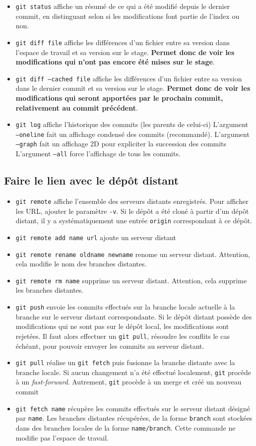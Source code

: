 \documentclass[french]{report}
\newcommand\itemb{\item[$\bullet$]}
\begin{document}
\begin{itemize}
    \itemb \texttt{git status} affiche un résumé de ce qui a été modifié depuis le dernier commit, en distinguant selon si les modifications font partie de l'index ou non.
    \itemb \texttt{git diff file} affiche les différences d'un fichier entre sa version dans l'espace de travail et sa version sur le stage.
    \textbf{Permet donc de voir les modifications qui n'ont pas encore été mises sur le stage}.
    \itemb \texttt{git diff ---cached file} affiche les différences d'un fichier entre sa version dans le dernier commit et sa version sur le stage.
    \textbf{Permet donc de voir les modifications qui seront apportées par le prochain commit, relativement au commit précédent}.
    \itemb \texttt{git log} affiche l'historique des commits (les parents de celui-ci)
    L'argument \texttt{---oneline} fait un affichage condensé des commits (recommandé).
    L'argument \texttt{---graph} fait un affichage 2D pour expliciter la succession des commits
    L'argument \texttt{---all} force l'affichage de tous les commits.
\end{itemize}

\subsection{Faire le lien avec le dépôt distant}

\begin{itemize}
    \itemb \texttt{git remote} affiche l'ensemble des serveurs distants enregistrés.
    Pour afficher les URL, ajouter le paramètre \texttt{-v}.
    Si le dépôt a été cloné à partir d'un dépôt distant, il y a systématiquement une entrée \texttt{origin} correspondant à ce dépôt.
    \itemb \texttt{git remote add name url} ajoute un serveur distant
    \itemb \texttt{git remote rename oldname newname} renome un serveur distant.
    Attention, cela modifie le nom des branches distantes.
    \itemb \texttt{git remote rm name} supprime un serveur distant.
    Attention, cela supprime les branches distantes.
    \itemb \texttt{git push} envoie les commits effectués sur la branche locale actuelle à la branche sur le serveur distant correspondante.
    Si le dépôt distant possède des modifications qui ne sont pas sur le dépôt local, les modifications sont rejetées.
    Il faut alors effectuer un \texttt{git pull}, résoudre les conflits le cas échéant, pour pouvoir envoyer les commits au serveur distant.
    \itemb \texttt{git pull} réalise un \texttt{git fetch} puis fusionne la branche distante avec la branche locale.
    Si aucun changement n'a été effectué localement, \texttt{git} procède à un \textit{fast-forward}.
    Autrement, \texttt{git} procède à un merge et créé un nouveau commit
    \itemb \texttt{git fetch name} récupère les commits effectués sur le serveur distant désigné par \texttt{name}.
    Les branches distantes récupérées, de la forme \texttt{branch} sont stockées dans des branches locales de la forme \texttt{name/branch}.
    Cette commande ne modifie pas l'espace de travail.
\end{itemize}
\end{document}
